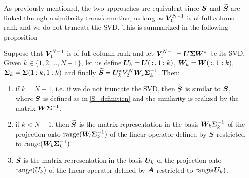 As previously mentioned, the two approaches are equivalent since $\vb*{S}$ and $\widetilde{\vb*{S}}$ are linked through a similarity transformation, as long as $\vb*{V}_1^{N-1}$ is of full column rank and we do not truncate the SVD. This is summarized in the following proposition
\begin{prop}
\label{prop_svd_dmd}
Suppose that $\vb*{V}_1^{N-1}$ is of full column rank and let $\vb*{V}_1^{N-1} = \vb*{U}\vb*{\Sigma}\vb*{W}^{*}$ be its SVD. Given $k\in\{1,2,\dots, N-1\}$, let us define $\vb*{U}_k = \vb*{U}(\,:\,, 1:k)$, $\vb*{W}_k = \vb*{W}(\,:\,, 1:k)$, $\vb*{\Sigma}_k = \vb*{\Sigma}(1:k, 1:k)$ and finally $\widetilde{\vb*{S}} = \vb*{U}_k^*\vb*{V}_2^N\vb*{W}_k\vb*{\Sigma}_k^{-1}$. Then:
\begin{enumerate}[label=(\roman*)]
    \item if $k = N-1$, i.e. if we do not truncate the SVD, then $\widetilde{\vb*{S}}$ is similar to $\vb*{S}$, where $\vb*{S}$ is defined as in \eqref{S_definition} and the similarity is realized by the matrix $\vb*{W}\vb*{\Sigma}^{-1}$.
    \item if $k < N-1$, then $\widetilde{\vb*{S}}$ is the matrix representation in the basis $\vb*{W}_k\vb*{\Sigma}^{-1}_k$ of the projection onto $\mathrm{range}(\vb*{W}_l\vb*{\Sigma}^{-1}_k)$ of the linear operator defined by $\vb*{S}$ restricted to $\mathrm{range}(\vb*{W}_k\vb*{\Sigma}^{-1}_k)$.
    \item $\widetilde{\vb*{S}}$ is the matrix representation in the basis $\vb*{U}_k$ of the projection onto $\mathrm{range}(\vb*{U}_k)$ of the linear operator defined by $\vb*{A}$ restricted to $\mathrm{range}(\vb*{U}_k)$.
\end{enumerate}
\end{prop}
